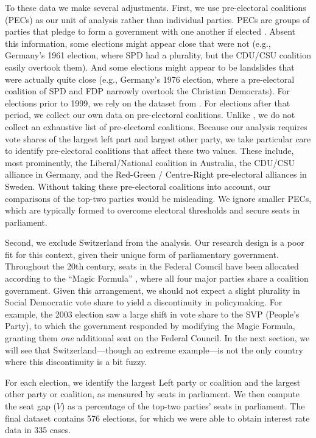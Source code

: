 \documentclass[12pt]{article}
\begin{document}
To these data we make several adjustments. First, we use pre-electoral coalitions (PECs) as our unit of analysis rather than individual parties. PECs are groups of parties that pledge to form a government with one another if elected \citep{Golder2006}. Absent this information, some elections might appear close that were not (e.g., Germany's 1961 election, where SPD had a plurality, but the CDU/CSU coalition easily overtook them). And some elections might appear to be landslides that were actually quite close (e.g., Germany's 1976 election, where a pre-electoral coalition of SPD and FDP narrowly overtook the Christian Democrats). For elections prior to 1999, we rely on the dataset from \citet{Golder2006}. For elections after that period, we collect our own data on pre-electoral coalitions. Unlike \citet{Golder2006}, we do not collect an exhaustive list of pre-electoral coalitions. Because our analysis requires vote shares of the largest left part and largest other party, we take particular care to identify pre-electoral coalitions that affect these two values. These include, most prominently, the Liberal/National coalition in Australia, the CDU/CSU alliance in Germany, and the Red-Green / Centre-Right pre-electoral alliances in Sweden. Without taking these pre-electoral coalitions into account, our comparisons of the top-two parties would be misleading. We ignore smaller PECs, which are typically formed to overcome electoral thresholds and secure seats in parliament. 




Second, we exclude Switzerland from the analysis. Our research design is a poor fit for this context, given their unique form of parliamentary government. Throughout the 20th century, seats in the Federal Council have been allocated according to the ``Magic Formula'' \citep{Dardanelli2005}, where all four major parties share a coalition government. Given this arrangement, we should not expect a slight plurality in Social Democratic vote share to yield a discontinuity in policymaking. For example, the 2003 election saw a large shift in vote share to the SVP (People's Party), to which the government responded by modifying the Magic Formula, granting them \textit{one} additional seat on the Federal Council. In the next section, we will see that Switzerland---though an extreme example---is not the only country where this discontinuity is a bit fuzzy.

For each election, we identify the largest Left party or coalition and the largest other party or coalition, as measured by seats in parliament. We then compute the seat gap ($V$) as a percentage of the top-two parties' seats in parliament. The final dataset contains 576 elections, for which we were able to obtain interest rate data in 335 cases.
\end{document}
